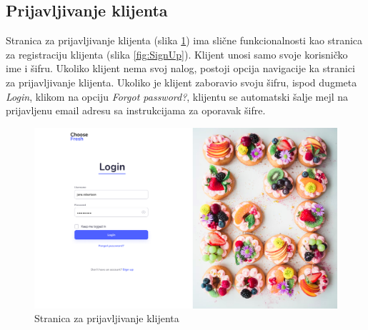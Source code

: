 \subsection{Prijavljivanje klijenta}

Stranica za prijavljivanje klijenta (slika \ref{fig:Login}) ima slične funkcionalnosti kao stranica za registraciju klijenta (slika \ref{fig:SignUp}). Klijent unosi samo svoje korisničko ime i šifru. Ukoliko klijent nema svoj nalog, postoji opcija navigacije ka stranici za prijavljivanje klijenta. Ukoliko je klijent zaboravio svoju šifru, ispod dugmeta \textit{Login}, klikom na opciju \textit{Forgot password?}, klijentu se automatski šalje mejl na prijavljenu email adresu sa instrukcijama za oporavak šifre. 

\begin{figure}[H]
	\begin{center}
		\includegraphics[width=\textwidth]{UI/Login.jpg}
    		\caption{Stranica za prijavljivanje klijenta}
    \label{fig:Login}
    \end{center}
\end{figure}

